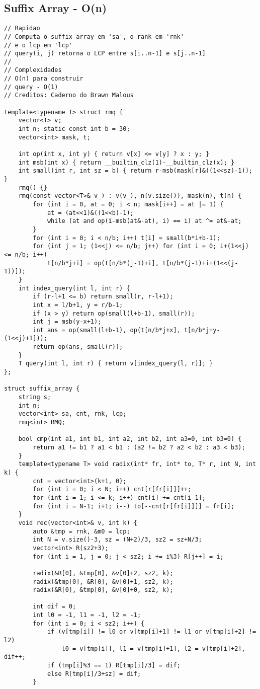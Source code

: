 \documentclass[11pt, a4paper, twoside]{article}
\begin{document}
\subsection{Suffix Array - O(n)}
\begin{verbatim}
// Rapidao
// Computa o suffix array em 'sa', o rank em 'rnk'
// e o lcp em 'lcp'
// query(i, j) retorna o LCP entre s[i..n-1] e s[j..n-1]
//
// Complexidades
// O(n) para construir
// query - O(1)
// Creditos: Caderno do Brawn Malous

template<typename T> struct rmq {
	vector<T> v;
	int n; static const int b = 30;
	vector<int> mask, t;
    
	int op(int x, int y) { return v[x] <= v[y] ? x : y; }
	int msb(int x) { return __builtin_clz(1)-__builtin_clz(x); }
	int small(int r, int sz = b) { return r-msb(mask[r]&((1<<sz)-1)); }
	rmq() {}
	rmq(const vector<T>& v_) : v(v_), n(v.size()), mask(n), t(n) {
		for (int i = 0, at = 0; i < n; mask[i++] = at |= 1) {
			at = (at<<1)&((1<<b)-1);
			while (at and op(i-msb(at&-at), i) == i) at ^= at&-at;
		}
		for (int i = 0; i < n/b; i++) t[i] = small(b*i+b-1);
		for (int j = 1; (1<<j) <= n/b; j++) for (int i = 0; i+(1<<j) <= n/b; i++)
			t[n/b*j+i] = op(t[n/b*(j-1)+i], t[n/b*(j-1)+i+(1<<(j-1))]);
	}
	int index_query(int l, int r) {
		if (r-l+1 <= b) return small(r, r-l+1);
		int x = l/b+1, y = r/b-1;
		if (x > y) return op(small(l+b-1), small(r));
		int j = msb(y-x+1);
		int ans = op(small(l+b-1), op(t[n/b*j+x], t[n/b*j+y-(1<<j)+1]));
		return op(ans, small(r));
	}
	T query(int l, int r) { return v[index_query(l, r)]; }
};

struct suffix_array {
	string s;
	int n;
	vector<int> sa, cnt, rnk, lcp;
	rmq<int> RMQ;
    
	bool cmp(int a1, int b1, int a2, int b2, int a3=0, int b3=0) {
		return a1 != b1 ? a1 < b1 : (a2 != b2 ? a2 < b2 : a3 < b3);
	}
	template<typename T> void radix(int* fr, int* to, T* r, int N, int k) {
		cnt = vector<int>(k+1, 0);
		for (int i = 0; i < N; i++) cnt[r[fr[i]]]++;
		for (int i = 1; i <= k; i++) cnt[i] += cnt[i-1];
		for (int i = N-1; i+1; i--) to[--cnt[r[fr[i]]]] = fr[i];
	}
	void rec(vector<int>& v, int k) {
		auto &tmp = rnk, &m0 = lcp;
		int N = v.size()-3, sz = (N+2)/3, sz2 = sz+N/3;
		vector<int> R(sz2+3);
		for (int i = 1, j = 0; j < sz2; i += i%3) R[j++] = i;
    
		radix(&R[0], &tmp[0], &v[0]+2, sz2, k);
		radix(&tmp[0], &R[0], &v[0]+1, sz2, k);
		radix(&R[0], &tmp[0], &v[0]+0, sz2, k);
    
		int dif = 0;
		int l0 = -1, l1 = -1, l2 = -1;
		for (int i = 0; i < sz2; i++) {
			if (v[tmp[i]] != l0 or v[tmp[i]+1] != l1 or v[tmp[i]+2] != l2)
				l0 = v[tmp[i]], l1 = v[tmp[i]+1], l2 = v[tmp[i]+2], dif++;
			if (tmp[i]%3 == 1) R[tmp[i]/3] = dif;
			else R[tmp[i]/3+sz] = dif;
		}
    

\end{verbatim}
\end{document}
